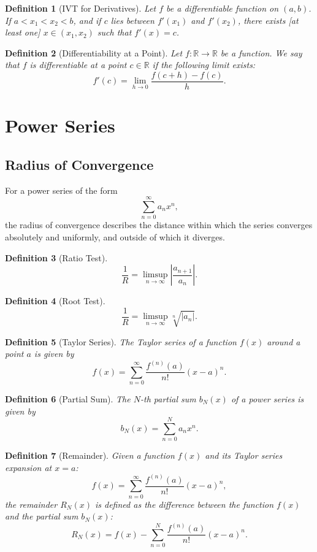 \documentclass{article}
\newtheorem{definition}{Definition}
\begin{document}
\begin{definition}[IVT for Derivatives]
Let \( f \) be a differentiable function on \( (a, b) \). If \( a < x_1 < x_2 < b \), and if \( c \) lies between \( f'(x_1) \) and \( f'(x_2) \), there exists [at least one] \( x \in (x_1, x_2) \) such that \( f'(x) = c \).
\end{definition}
\begin{definition}[Differentiability at a Point]
Let \( f : \mathbb{R} \to \mathbb{R} \) be a function. We say that \( f \) is differentiable at a point \( c \in \mathbb{R} \) if the following limit exists:
\[
f'(c) = \lim_{h \to 0} \frac{f(c+h) - f(c)}{h}.
\]

\end{definition}

\section*{Power Series}
\subsection*{Radius of Convergence}
For a power series of the form
\[
\sum_{n=0}^{\infty} a_n x^n,
\]
the radius of convergence describes the distance within which the series converges absolutely and uniformly, and outside of which it diverges.
\begin{definition}[Ratio Test]
\[
\frac{1}{R} = \limsup_{n \to \infty} \left| \frac{a_{n+1}}{a_n} \right|.
\]
\end{definition}
\begin{definition}[Root Test]
\[
\frac{1}{R} = \limsup_{n \to \infty} \sqrt[n]{|a_n|}.
\]
\end{definition}
\begin{definition}[Taylor Series]
The Taylor series of a function \( f(x) \) around a point \( a \) is given by
\[
f(x) = \sum_{n=0}^{\infty} \frac{f^{(n)}(a)}{n!}(x - a)^n.
\]
\end{definition}
\begin{definition}[Partial Sum]
The \( N \)-th partial sum \( b_N(x) \) of a power series is given by
\[
b_N(x) = \sum_{n=0}^{N} a_n x^n.
\]
\end{definition}
\begin{definition}[Remainder]
Given a function \( f(x) \) and its Taylor series expansion at \( x = a \):
\[
f(x) = \sum_{n=0}^{\infty} \frac{f^{(n)}(a)}{n!} (x-a)^n,
\]
the remainder \( R_N(x) \) is defined as the difference between the function \( f(x) \) and the partial sum \( b_N(x) \):
\[
R_N(x) = f(x) - \sum_{n=0}^{N} \frac{f^{(n)}(a)}{n!} (x-a)^n.
\]
\end{definition}
\end{document}
